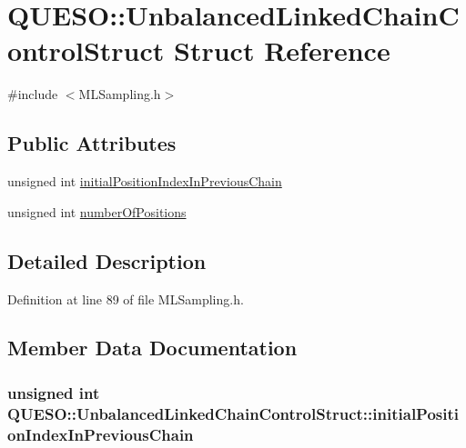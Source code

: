 \hypertarget{struct_q_u_e_s_o_1_1_unbalanced_linked_chain_control_struct}{\section{Q\-U\-E\-S\-O\-:\-:Unbalanced\-Linked\-Chain\-Control\-Struct Struct Reference}
\label{struct_q_u_e_s_o_1_1_unbalanced_linked_chain_control_struct}
}


{\ttfamily \#include $<$M\-L\-Sampling.\-h$>$}

\subsection*{Public Attributes}
\begin{DoxyCompactItemize}
\item 
unsigned int \hyperlink{struct_q_u_e_s_o_1_1_unbalanced_linked_chain_control_struct_aa56937caf292c7197b0bbf707d43c935}{initial\-Position\-Index\-In\-Previous\-Chain}
\item 
unsigned int \hyperlink{struct_q_u_e_s_o_1_1_unbalanced_linked_chain_control_struct_a6269fe962299d5013aa918a80273762e}{number\-Of\-Positions}
\end{DoxyCompactItemize}


\subsection{Detailed Description}


Definition at line 89 of file M\-L\-Sampling.\-h.



\subsection{Member Data Documentation}
\hypertarget{struct_q_u_e_s_o_1_1_unbalanced_linked_chain_control_struct_aa56937caf292c7197b0bbf707d43c935}{
\subsubsection[{initial\-Position\-Index\-In\-Previous\-Chain}]{\setlength{\rightskip}{0pt plus 5cm}unsigned int Q\-U\-E\-S\-O\-::\-Unbalanced\-Linked\-Chain\-Control\-Struct\-::initial\-Position\-Index\-In\-Previous\-Chain}}\label{struct_q_u_e_s_o_1_1_unbalanced_linked_chain_control_struct_aa56937caf292c7197b0bbf707d43c935}


